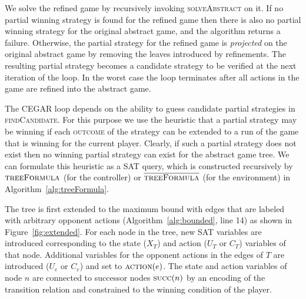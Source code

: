 \documentclass{llncs}
\newcommand{\textoverline}[1]{$\overline{\mbox{#1}}$}
\begin{document}
We solve the refined game by recursively invoking \textsc{solveAbstract} on it.
If no partial winning strategy is found for the refined game then there is also
no partial winning strategy for the original abstract game, and the algorithm
returns a failure.  Otherwise, the partial strategy for the refined game is
\emph{projected} on the original abstract game by removing the leaves
introduced by refinements. The resulting partial strategy becomes a candidate
strategy to be verified at the next iteration of the loop. In the worst case
the loop terminates after all actions in the game are refined into the abstract
game.

The CEGAR loop depends on the ability to guess candidate partial strategies in
\textsc{findCandidate}. For this purpose we use the heuristic that a partial
strategy may be winning if each \textsc{outcome} of the strategy can be
extended to a run of the game that is winning for the current player.  Clearly,
if such a partial strategy does not exist then no winning partial strategy can
exist for the abstract game tree. We can formulate this heuristic as a SAT
query, which is constructed recursively by $\textsc{treeFormula}$ (for the
controller) or $\textsc{\textoverline{treeFormula}}$ (for the environment) in
Algorithm~\ref{alg:treeFormula}.

The tree is first extended to the maximum bound with edges that are labeled
with arbitrary opponent actions (Algorithm~\ref{alg:bounded}, line 14) as shown
in Figure~\ref{fig:extended}.  For each node in the tree, new SAT variables are
introduced corresponding to the state ($X_T$) and action ($U_T$ or $C_T$)
variables of that node. Additional variables for the opponent actions in the
edges of $T$ are introduced ($U_e$ or $C_e$) and set to $\textsc{action}(e)$.
The state and action variables of node $n$ are connected to successor nodes
$\textsc{succ}(n)$ by an encoding of the transition relation and constrained to
the winning condition of the player.


\end{document}
